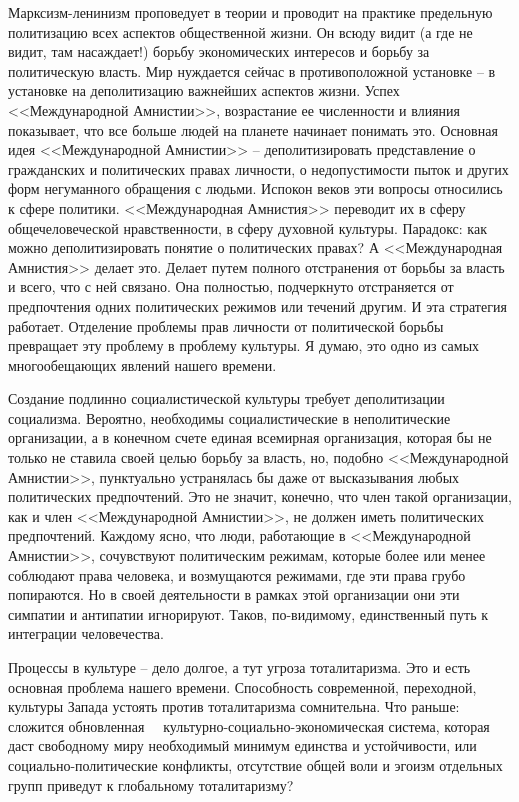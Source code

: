 \documentclass{book}
\begin{document}
Марксизм-ленинизм проповедует в теории и проводит на практике предельную политизацию всех аспектов обществен­ной жизни. Он всюду видит (а где не видит, там насаждает!) борьбу экономических интересов и борьбу за политическую власть. Мир нуждается сейчас в противоположной установке -- в установке на деполитизацию  важнейших аспектов жизни. Успех <<Международной Амнистии>>, возрастание ее численно­сти и влияния показывает, что все больше людей на планете начи­нает понимать это. Основная идея <<Международной Амнистии>> -- деполитизировать представление о гражданских и поли­тических правах личности, о недопустимости пыток и других форм негуманного обращения с людьми. Испокон веков эти вопросы относились к сфере политики. <<Международная Амни­стия>> переводит их в сферу общечеловеческой нравственности, в сферу духовной культуры. Парадокс: как можно деполитизи­ровать понятие о политических  правах? А <<Международная Амнистия>> делает это. Делает путем полного отстранения от борьбы за власть  и всего, что с ней 
связано. 
Она полностью, подчеркнуто отстраняется от предпочтения одних политиче­ских режимов или течений другим. И эта стратегия работает. Отделение проблемы прав личности от политической борьбы превращает эту проблему в проблему культуры. Я думаю, это одно из самых многообещающих явлений нашего времени.

Создание подлинно социалистической культуры требует деполитизации социализма. Вероятно, необходимы социалисти­ческие в неполитические  организации, а в конечном счете еди­ная всемирная организация, которая бы не только не ставила своей целью борьбу за власть, но, подобно <<Международной Амнистии>>, пунктуально устранялась бы даже от высказывания любых политических предпочтений. Это не значит, конеч­но, что член такой организации, как и член <<Международной Амнистии>>, не должен иметь  политических предпочтений. Каж­дому ясно, что люди, работающие в <<Международной Амни­стии>>, сочувствуют политическим режимам, которые более или менее соблюдают права человека, и возмущаются режимами, где эти права грубо попираются. Но в своей деятельности в рам­ках этой организации они эти симпатии и антипатии игнорируют. Таков, по-видимому, единственный путь к интеграции челове­чества.

Процессы в культуре -- дело долгое, а тут угроза тоталита­ризма. Это и есть основная проблема нашего времени. Способ­ность современной, переходной, культуры Запада устоять против тоталитаризма сомнительна. Что раньше: сложится обновлен­ная   культурно-социально-экономическая система, которая даст свободному миру необходимый минимум единства и ус­тойчивости, или социально-политические конфликты, отсутст­вие общей воли и эгоизм отдельных групп приведут к глобаль­ному тоталитаризму?
\end{document}
